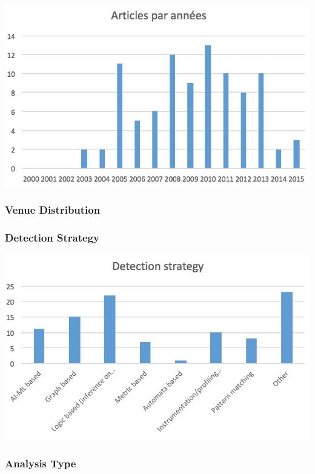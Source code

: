 \documentclass[letterpaper, 10 pt, conference]{ieeeconf}  %
\begin{document}
\begin{center}
\includegraphics[scale=0.75]{articles_by_years.png}
\end{center}


\subsubsection{Venue Distribution}


\subsubsection{Detection Strategy}


\begin{center}
\includegraphics[scale=0.75]{detection_strategy.png}
\end{center}


\subsubsection{Analysis Type}
\end{document}
